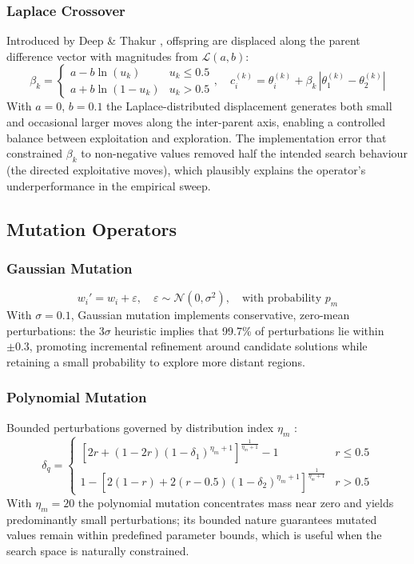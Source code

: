 \documentclass[12pt, a4paper]{article}
\begin{document}
\subsubsection{Laplace Crossover}
Introduced by Deep \& Thakur \cite{deep2007}, offspring are displaced along the parent difference vector with magnitudes from $\mathcal{L}(a,b)$:
\[
\beta_k = \begin{cases} a - b\ln(u_k) & u_k \leq 0.5 \\ a + b\ln(1-u_k) & u_k > 0.5 \end{cases}\!, \quad
c_i^{(k)} = \theta_i^{(k)} + \beta_k\,|\theta_1^{(k)} - \theta_2^{(k)}|
\]
With $a=0$, $b=0.1$ the Laplace-distributed displacement generates both small and occasional larger moves along the inter-parent axis, enabling a controlled balance between exploitation and exploration. The implementation error that constrained $\beta_k$ to non-negative values removed half the intended search behaviour (the directed exploitative moves), which plausibly explains the operator's underperformance in the empirical sweep.

\subsection{Mutation Operators}

\subsubsection{Gaussian Mutation}
\[
w_i' = w_i + \varepsilon, \quad \varepsilon \sim \mathcal{N}(0,\sigma^2), \quad \text{with probability } p_m
\]
With $\sigma=0.1$, Gaussian mutation implements conservative, zero-mean perturbations: the $3\sigma$ heuristic implies that 99.7\% of perturbations lie within $\pm0.3$, promoting incremental refinement around candidate solutions while retaining a small probability to explore more distant regions.

\subsubsection{Polynomial Mutation}
Bounded perturbations governed by distribution index $\eta_m$ \cite{polymut}:
\[
\delta_q = \begin{cases}
[2r + (1{-}2r)(1{-}\delta_1)^{\eta_m+1}]^{\frac{1}{\eta_m+1}} - 1 & r \leq 0.5 \\[4pt]
1 - [2(1{-}r) + 2(r{-}0.5)(1{-}\delta_2)^{\eta_m+1}]^{\frac{1}{\eta_m+1}} & r > 0.5
\end{cases}
\]
With $\eta_m=20$ the polynomial mutation concentrates mass near zero and yields predominantly small perturbations; its bounded nature guarantees mutated values remain within predefined parameter bounds, which is useful when the search space is naturally constrained.
\end{document}
